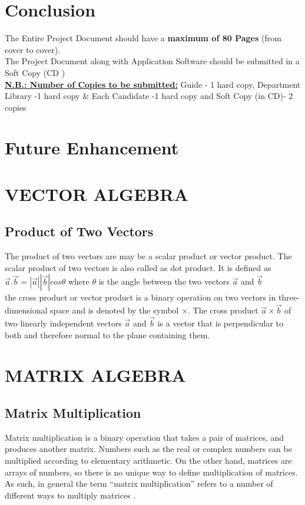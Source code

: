 \documentclass[BTech]{srmuthesis}
\begin{document}
\chapter{Conclusion}
The Entire Project Document should have a \textbf{maximum of 80 Pages} (from cover to cover).\\
The Project Document along with Application Software should be submitted in a Soft Copy (CD )\\
\underline{\textbf{N.B.: Number of Copies to be submitted:}}
Guide - 1 hard copy, Department Library -1 hard copy \&
 Each Candidate -1 hard copy and Soft Copy (in CD)- 2 copies
\chapter{Future Enhancement}


\appendix
\chapter{VECTOR ALGEBRA}
\section{Product of Two Vectors}
\label{app:vp}
The product of two vectors are may be a scalar product or vector product. The scalar product of two vectors is also called as dot product. It is defined as $\vec{a} . \vec{b}=|\vec{a}||\vec{b}|cos\theta$ where $\theta$ is the angle between the two vectors $\vec{a}$ and $\vec{b}$\\

the cross product or vector product is a binary operation on two vectors in three-dimensional space and is denoted by the symbol $\times$. The cross product $\vec{a}\times\vec{b}$ of two linearly independent vectors $\vec{a}$ and $\vec{b}$ is a vector that is perpendicular to both and therefore normal to the plane containing them. 
\chapter{MATRIX ALGEBRA}
\section{Matrix Multiplication}
Matrix multiplication is a binary operation that takes a pair of matrices, and produces another matrix. Numbers such as the real or complex numbers can be multiplied according to elementary arithmetic. On the other hand, matrices are arrays of numbers, so there is no unique way to define multiplication of matrices. As such, in general the term ``matrix multiplication'' refers to a number of different ways to multiply matrices \cite{8488003}. 

\begin{singlespace}
\end{singlespace}
  
\end{document}

